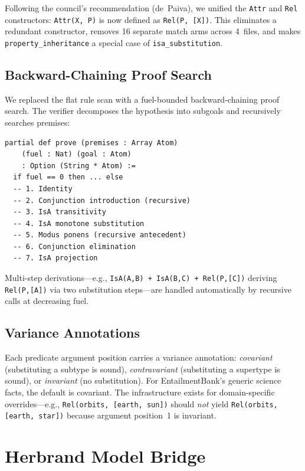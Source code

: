 \documentclass[]{article}
\newcommand{\code}[1]{\texttt{#1}}
\begin{document}
Following the council's recommendation (de~Paiva), we unified the
\code{Attr} and \code{Rel} constructors: \code{Attr(X, P)} is now
defined as \code{Rel(P, [X])}.  This eliminates a redundant constructor,
removes 16 separate match arms across 4~files, and makes
\code{property\_inheritance} a special case of \code{isa\_substitution}.

\subsection{Backward-Chaining Proof Search}

We replaced the flat rule scan with a fuel-bounded backward-chaining
proof search.  The verifier decomposes the hypothesis into subgoals and
recursively searches premises:

\begin{lstlisting}
partial def prove (premises : Array Atom)
    (fuel : Nat) (goal : Atom)
    : Option (String * Atom) :=
  if fuel == 0 then ... else
  -- 1. Identity
  -- 2. Conjunction introduction (recursive)
  -- 3. IsA transitivity
  -- 4. IsA monotone substitution
  -- 5. Modus ponens (recursive antecedent)
  -- 6. Conjunction elimination
  -- 7. IsA projection
\end{lstlisting}

Multi-step derivations---e.g., \code{IsA(A,B) + IsA(B,C) + Rel(P,[C])}
deriving \code{Rel(P,[A])} via two substitution steps---are handled
automatically by recursive calls at decreasing fuel.

\subsection{Variance Annotations}

Each predicate argument position carries a variance annotation:
\emph{covariant} (substituting a subtype is sound),
\emph{contravariant} (substituting a supertype is sound), or
\emph{invariant} (no substitution).  For EntailmentBank's generic
science facts, the default is covariant.  The infrastructure exists
for domain-specific overrides---e.g., \code{Rel(orbits, [earth, sun])}
should \emph{not} yield \code{Rel(orbits, [earth, star])} because
argument position~1 is invariant.

\section{Herbrand Model Bridge}
\label{sec:herbrand}
\end{document}
